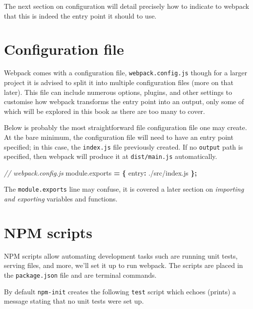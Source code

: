 \documentclass[
]{krantz}
\makeatletter
\newenvironment{Shaded}{\begin{snugshade}}{\end{snugshade}}
\newcommand{\AttributeTok}[1]{\textcolor[rgb]{0.61,0.61,0.61}{#1}}
\newcommand{\CommentTok}[1]{\textcolor[rgb]{0.37,0.37,0.37}{\textit{#1}}}
\newcommand{\DataTypeTok}[1]{\textcolor[rgb]{0.27,0.27,0.27}{#1}}
\newcommand{\NormalTok}[1]{#1}
\newcommand{\OperatorTok}[1]{\textcolor[rgb]{0.43,0.43,0.43}{\textbf{#1}}}
\newcommand{\StringTok}[1]{\textcolor[rgb]{0.5,0.5,0.5}{#1}}
\newcommand{\VariableTok}[1]{\textcolor[rgb]{0,0,0}{#1}}
\newenvironment{kframe}{%
\medskip{}
\setlength{\fboxsep}{.8em}
 \def\at@end@of@kframe{}%
 \ifinner\ifhmode%
  \def\at@end@of@kframe{\end{minipage}}%
  \begin{minipage}{\columnwidth}%
 \fi\fi%
 \def\FrameCommand##1{\hskip\@totalleftmargin \hskip-\fboxsep
 \colorbox{shadecolor}{##1}\hskip-\fboxsep
     \hskip-\linewidth \hskip-\@totalleftmargin \hskip\columnwidth}%
 \MakeFramed {\advance\hsize-\width
   \@totalleftmargin\z@ \linewidth\hsize
   \@setminipage}}%
 {\par\unskip\endMakeFramed%
 \at@end@of@kframe}
\renewenvironment{Shaded}{\begin{kframe}}{\end{kframe}}
\makeatother
\begin{document}
The next section on configuration will detail precisely how to indicate to webpack that this is indeed the entry point it should to use.

\hypertarget{webpack-intro-conf}{%
\section{Configuration file}\label{webpack-intro-conf}}

Webpack comes with a configuration file, \texttt{webpack.config.js} though for a larger project it is advised to split it into multiple configuration files (more on that later). This file can include numerous options, plugins, and other settings to customise how webpack transforms the entry point into an output, only some of which will be explored in this book as there are too many to cover.

Below is probably the most straightforward file configuration file one may create. At the bare minimum, the configuration file will need to have an entry point specified; in this case, the \texttt{index.js} file previously created. If no \texttt{output} path is specified, then webpack will produce it at \texttt{dist/main.js} automatically.

\begin{Shaded}
\begin{Highlighting}[]
\CommentTok{// webpack.config.js}
\VariableTok{module}\NormalTok{.}\AttributeTok{exports} \OperatorTok{=} \OperatorTok{\{}
  \DataTypeTok{entry}\OperatorTok{:} \StringTok{\textquotesingle{}./src/index.js\textquotesingle{}}
\OperatorTok{\};}
\end{Highlighting}
\end{Shaded}

The \texttt{module.exports} line may confuse, it is covered a later section on \emph{importing and exporting} variables and functions.

\hypertarget{webpack-intro-npm-scripts}{%
\section{NPM scripts}\label{webpack-intro-npm-scripts}}

NPM scripts allow automating development tasks such are running unit tests, serving files, and more, we'll set it up to run webpack. The scripts are placed in the \texttt{package.json} file and are terminal commands.

By default \texttt{npm-init} creates the following \texttt{test} script which echoes (prints) a message stating that no unit tests were set up.
\end{document}
